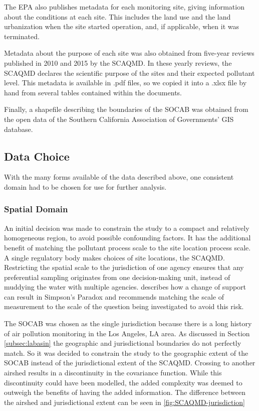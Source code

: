 \documentclass{article}
\begin{document}
The \ac{EPA} also publishes metadata for each monitoring site, giving information about the conditions at each site.  This includes the land use and the land urbanization when the site started operation, and, if applicable, when it was terminated.

Metadata about the purpose of each site was also obtained from five-year reviews published in 2010 and 2015 by the \ac{SCAQMD}. In these yearly reviews, the \ac{SCAQMD} declares the scientific purpose of the sites and their expected pollutant level. This metadata is available in .pdf files, so we copied it into a .xlsx file by hand from several tables contained within the documents.

Finally, a shapefile describing the boundaries of the \ac{SOCAB} was obtained from the open data of the Southern California Association of Governments' GIS database.




\subsection{Data Choice}\label{subsec:datachoice}
With the many forms available of the data described above, one consistent domain had to be chosen for use for further analysis. 

\subsubsection*{Spatial Domain} \label{subsubsec:SpatialDomain}
An initial decision was made to constrain the study to a compact and relatively homogeneous region, to avoid possible confounding factors. It has the additional benefit of matching the pollutant process scale to the site location process scale.  A single regulatory body makes choices of site locations, the \ac{SCAQMD}.  Restricting the spatial scale to the jurisdiction of one agency ensures that any 
preferential sampling originates from one decision-making unit, instead of muddying the water with multiple agencies.   \cite{cressie2011statistics} describes how a change of support can result in Simpson's Paradox and recommends matching the scale of measurement to the scale of the question being investigated to avoid this risk.

The \ac{SOCAB} was chosen as the single jurisdiction because there is a long history of air pollution monitoring in the Los Angeles, LA area.  As discussed in Section \ref{subsec:labasin} the geographic and jurisdictional boundaries do not perfectly match.  So it was decided to constrain the study to the geographic extent of the \ac{SOCAB} instead of the jurisdictional extent of the \ac{SCAQMD}.  Crossing to another airshed results in a discontinuity in the covariance function.  While this discontinuity could have been modelled, the added complexity was deemed to outweigh the benefits of having the added information. The difference between the airshed and jurisdictional extent can be seen in \ref{fig:SCAQMD-jurisdiction}
\end{document}
